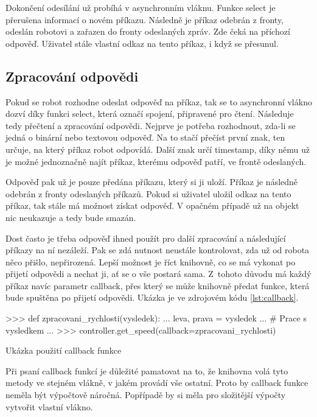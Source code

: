     Dokončení odesílání už probíhá v asynchronním vláknu. Funkce select je
    přerušena informací o novém příkazu. Následně je příkaz odebrán z fronty,
    odeslán robotovi a zařazen do fronty odeslaných zpráv. Zde čeká na příchozí
    odpověď. Uživatel stále vlastní odkaz na tento příkaz, i když se přesunul.

    \subsection{Zpracování odpovědi}

    Pokud se robot rozhodne odeslat odpověď na příkaz, tak se to asynchronní
    vlákno dozví díky funkci select, která označí spojení, připravené pro čtení.
    Následuje tedy přečtení a zpracování odpovědi. Nejprve je potřeba
    rozhodnout, zda-li se jedná o binární nebo textovou odpověď. Na to stačí
    přečíst první znak, ten určuje, na který příkaz robot odpovídá. Další znak
    určí timestamp, díky němu už je možné jednoznačně najít příkaz, kterému
    odpověď patří, ve frontě odeslaných.

    Odpověď pak už je pouze předána příkazu, který si ji uloží. Příkaz je
    následně odebrán z fronty odeslaných příkazů. Pokud si uživatel uložil
    odkaz na tento příkaz, tak stále má možnost získat odpověď. V opačném
    případě už na objekt nic neukazuje a tedy bude smazán.

    Dost často je třeba odpověď ihned použít pro další zpracování a následující
    příkazy na ní nezáleží. Pak se zdá nutnost neustále kontrolovat, zda už od
    robota něco přišlo, nepřirozená. Lepší možnost je říct knihovně, co se má
    vykonat po přijetí odpovědi a nechat ji, ať se o vše postará sama. Z~tohoto
    důvodu má každý příkaz navíc parametr callback, přes který se může knihovně
    předat funkce, která bude spuštěna po přijetí odpovědi. Ukázka je ve
    zdrojovém kódu \ref{lst:callback}.

    \begin{listing}
    \begin{pyc}
>>> def zpracovani_rychlosti(vysledek):
...    leva, prava = vysledek
...    # Prace s vysledkem
...
>>> controller.get_speed(callback=zpracovani_rychlosti)
    \end{pyc}
    \caption{Ukázka použití callback funkce}
    \label{lst:callback}
    \end{listing}

    Při psaní callback funkcí je důležité pamatovat na to, že knihovna volá
    tyto metody ve stejném vlákně, v jakém provádí vše ostatní. Proto by
    callback funkce neměla být výpočtově náročná. Popřípadě by si měla pro
    složitější výpočty vytvořit vlastní vlákno.


